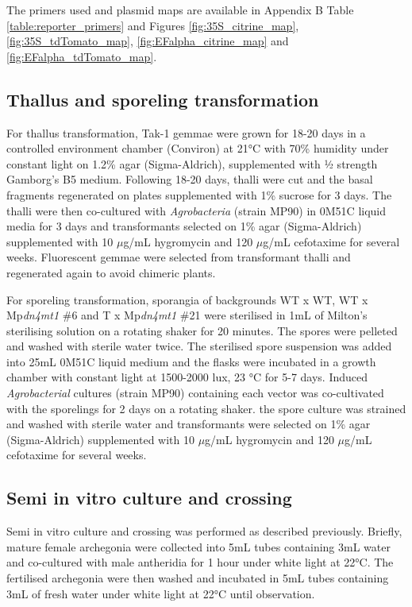 The primers used and plasmid maps are available in Appendix B Table \ref{table:reporter_primers} and Figures \ref{fig:35S_citrine_map}, \ref{fig:35S_tdTomato_map}, \ref{fig:EFalpha_citrine_map} and \ref{fig:EFalpha_tdTomato_map}.

\subsection{Thallus and sporeling transformation}

For thallus transformation, Tak-1 gemmae were grown for 18-20 days in a controlled environment chamber (Conviron) at 21°C with 70\% humidity under constant light on 1.2\% agar (Sigma-Aldrich), supplemented with ½ strength Gamborg's B5 medium. Following 18-20 days, thalli were cut and the basal fragments regenerated on plates supplemented with 1\% sucrose for 3 days. The thalli were then co-cultured with \textit{Agrobacteria} (strain MP90) in 0M51C liquid media for 3 days and transformants selected on 1\% agar (Sigma-Aldrich) supplemented with 10 $\mu$g/mL hygromycin and 120 $\mu$g/mL cefotaxime for several weeks. Fluorescent gemmae were selected from transformant thalli and regenerated again to avoid chimeric plants\cite{RN147}. 

For sporeling transformation, sporangia of backgrounds WT x WT, WT x Mp\textit{dn4mt1} \#6 and T x Mp\textit{dn4mt1} \#21 were sterilised in 1mL of Milton's sterilising solution on a rotating shaker for 20 minutes. The spores were pelleted and washed with sterile water twice. The sterilised spore suspension was added into 25mL 0M51C liquid medium and the flasks were incubated in a growth chamber with constant light at 1500-2000 lux, 23 °C for 5-7 days. Induced \textit{Agrobacterial} cultures (strain MP90) containing each vector was co-cultivated with the sporelings for 2 days on a rotating shaker. the spore culture was strained and washed with sterile water and transformants were selected on 1\% agar (Sigma-Aldrich) supplemented with 10 $\mu$g/mL hygromycin and 120 $\mu$g/mL cefotaxime for several weeks\cite{RN146}.

\subsection{Semi in vitro culture and crossing}

Semi in vitro culture and crossing was performed as described previously\cite{RN139}. Briefly, mature female archegonia were collected into 5mL tubes containing 3mL water and co-cultured with male antheridia for 1 hour under white light at 22°C. The fertilised archegonia were then washed and incubated in 5mL tubes containing 3mL of fresh water under white light at 22°C until observation.

